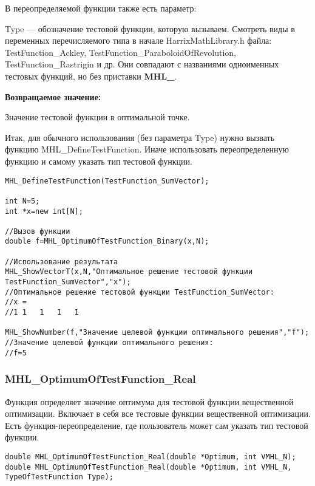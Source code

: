 \documentclass[a4paper,12pt]{article}
\begin{document}
В переопределяемой функции также есть параметр:
  
Type --- обозначение тестовой функции, которую вызываем.
Смотреть виды в переменных перечисляемого типа в начале HarrixMathLibrary.h файла: TestFunction\_Ackley, TestFunction\_ParaboloidOfRevolution, TestFunction\_Rastrigin и др. Они совпадают с названиями одноименных тестовых функций, но без приставки \textbf{MHL\_}.

\textbf{Возвращаемое значение:}
 
Значение тестовой функции в оптимальной точке.

Итак, для обычного использования (без параметра Type) нужно вызвать функцию MHL\_DefineTestFunction. Иначе использовать переопределенную функцию и самому указать тип тестовой функции.


\begin{lstlisting}[label=code_use_MHL_OptimumOfTestFunction_Binary,caption=Пример использования]
MHL_DefineTestFunction(TestFunction_SumVector);

int N=5;
int *x=new int[N];

//Вызов функции
double f=MHL_OptimumOfTestFunction_Binary(x,N);

//Использование результата
MHL_ShowVectorT(x,N,"Оптимальное решение тестовой функции TestFunction_SumVector","x");
//Оптимальное решение тестовой функции TestFunction_SumVector:
//x =	
//1	1	1	1	1

MHL_ShowNumber(f,"Значение целевой функции оптимального решения","f");
//Значение целевой функции оптимального решения:
//f=5
\end{lstlisting}

\subsubsection{MHL\_OptimumOfTestFunction\_Real}\label{MHL_OptimumOfTestFunction_Real}

Функция определяет значение оптимума для тестовой функции вещественной оптимизации. Включает в себя все тестовые функции вещественной оптимизации. Есть функция-переопределение, где пользователь может сам указать тип тестовой функции.


\begin{lstlisting}[label=code_syntax_MHL_OptimumOfTestFunction_Real,caption=Синтаксис]
double MHL_OptimumOfTestFunction_Real(double *Optimum, int VMHL_N);
double MHL_OptimumOfTestFunction_Real(double *Optimum, int VMHL_N, TypeOfTestFunction Type);
\end{lstlisting}
\end{document}
